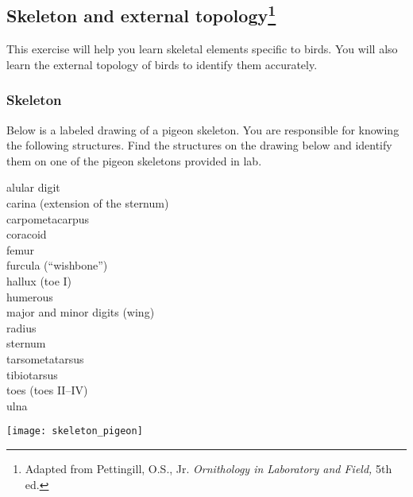 \documentclass[10pt]{article}
\begin{document}
\thispagestyle{plain}

\subsection*{Skeleton and external topology\footnote{Adapted from
		Pettingill, O.S., Jr. \textit{Ornithology in Laboratory and Field,} 
		5th ed.}}

	This exercise will help you learn skeletal elements specific 
	to birds. You will also learn the external topology of birds to 
	identify them accurately. 


\subsubsection*{Skeleton}

	Below is a labeled drawing of a pigeon skeleton. You are 
	responsible for knowing the following structures. Find 
	the structures on the drawing below and identify them 
	on one of the pigeon skeletons provided in lab.

\begin{multicols}{3}
	alular digit\\
	carina (extension of the sternum)\\
	carpometacarpus\\
	coracoid\\
	femur\\
	furcula (“wishbone”)\\
	hallux (toe I)\\
	humerous\\
	major and minor digits (wing)\\
	radius\\
	sternum\\
	tarsometatarsus\\
	tibiotarsus\\
	toes (toes II–IV)\\
	ulna
\end{multicols}


\begin{center}
	\texttt{[image: skeleton\_pigeon]}
\end{center}

\newpage
\end{document}

